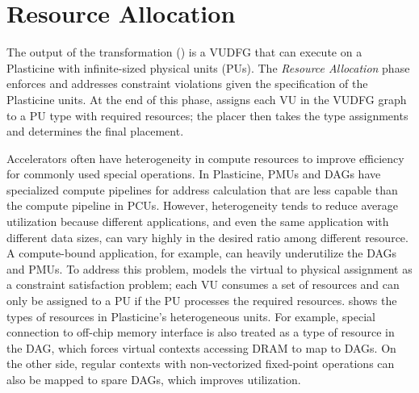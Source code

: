 \section{Resource Allocation} \label{sec:decompose}

The output of the transformation () is a VUDFG that 
can execute on a Plasticine with infinite-sized physical units (PUs).
The \emph{Resource Allocation} phase enforces and addresses constraint violations given 
the specification of the Plasticine units. 
At the end of this phase, \name assigns each VU in the VUDFG graph to a PU type with required
resources; the placer then takes the type assignments and determines the final placement.

Accelerators often have heterogeneity in compute resources to improve efficiency for commonly used
special operations.
In Plasticine, PMUs and DAGs have specialized compute pipelines for address calculation that are 
less capable than the compute pipeline in PCUs.
However, heterogeneity tends to reduce average utilization because different applications, and even the same
application with different data sizes, can vary highly in the desired ratio among different resource.
A compute-bound application, for example, can heavily underutilize the DAGs and PMUs.
To address this problem, \name models the virtual to physical assignment as a constraint satisfaction problem; 
each VU consumes a set of resources and can only be assigned to a PU if the PU processes the required resources. 
 shows the types of resources in Plasticine's heterogeneous units.
For example, special connection to off-chip memory interface is
also treated as a type of resource in the DAG, which forces virtual contexts accessing DRAM to map to DAGs. 
On the other side, regular contexts with non-vectorized fixed-point operations can also be mapped to
spare DAGs, which improves utilization.
